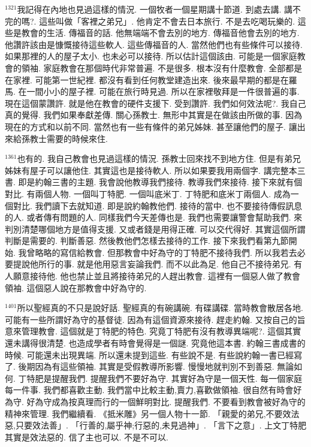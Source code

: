 \documentclass{book}
\begin{document}
$^{1321}$我記得在內地也見過這樣的情況.
一個牧者一個星期講十節道.
到處去講.
講不完的嗎?.
這些叫做「客裡之弟兄」.
他肯定不會去日本旅行.
不是去吃喝玩樂的.
這些是教會的生活.
傳福音的話.
他無端端不會去別的地方.
傳福音他會去別的地方.
他讚許該由是慷慨接待這些軟人.
這些傳福音的人.
當然他們也有些條件可以接待.
如果那裡的人的屋子太小.
也未必可以接待.
所以估計這個該由.
可能是一個家庭教會的領袖.
家庭教會在那個時代非常普遍.
不是很多.
根本沒有什麼教會.
全部都是在家裡.
可能第一世紀裡.
都沒有看到任何教堂建造出來.
後來最早期的都是在羅馬.
在一間小小的屋子裡.
可能在旅行時見過.
所以在家裡敬拜是一件很普遍的事.
現在這個蒙讚許.
就是他在教會的硬件支援下.
受到讚許.
我們如何效法呢?.
我自己真的覺得.
我們如果奉獻差傳.
關心孫教士.
無形中其實是在做該由所做的事.
因為現在的方式和以前不同.
當然也有一些有條件的弟兄姊妹.
甚至讓他們的屋子.
讓出來給孫教士需要的時候來住.

$^{1361}$也有的.
我自己教會也見過這樣的情況.
孫教士回來找不到地方住.
但是有弟兄姊妹有屋子可以讓他住.
其實這也是接待軟人.
所以如果要我用兩個字.
講完整本三書.
即是約翰三書的主題.
我會說他教導我們接待.
教導我們來接待.
接下來就有個對比.
有兩個人物.
一個叫丁特肥.
一個叫底米丁.
丁特肥和底米丁兩個人.
成為一個對比.
我們讀下去就知道.
即是說約翰教他們.
接待的當中.
也不要接待傳假訊息的人.
或者傳有問題的人.
同樣我們今天差傳也是.
我們也需要讓警會幫助我們.
來判別清楚哪個地方是值得支援.
又或者錢是用得正確.
可以交代得好.
其實這個所謂判斷是需要的.
判斷善惡.
然後教他們怎樣去接待的工作.
接下來我們看第九節開始.
我曾略略的寫信給教會.
但那教會中好為守的丁特肥不接待我們.
所以我若去必要提說他所行的事.
就是他用惡言妄論我們.
而不以此為足.
他自己不接待弟兄.
有人願意接待他.
他也禁止並且將接待弟兄的人趕出教會.
這裡有一個惡人做了教會領袖.
這個惡人說在那教會中好為守的.

$^{1401}$所以聖經真的不只是說好話.
聖經真的有碗講碗.
有碟講碟.
當時教會散居各地.
可能有一些所謂好為守的基督徒.
因為有這個資源來接待.
趕走約翰.
又按自己的旨意來管理教會.
這個就是丁特肥的特色.
究竟丁特肥有沒有教導異端呢?.
這個其實還未講得很清楚.
也造成學者有時會覺得是一個謎.
究竟他這本書.
約翰三書成書的時候.
可能還未出現異端.
所以還未提到這些.
有些說不是.
有些說約翰一書已經寫了.
後期因為有這些領袖.
其實是受假教導所影響.
慢慢地就判別不到善惡.
無論如何.
丁特肥是提醒我們.
提醒我們不要好為守.
其實好為守是一個天性.
每一個家庭每一件事.
我們都喜歡主動.
我們當中比較主動,賣力,喜歡做領袖.
很自然有時會好為守.
好為守成為按真理而行的一個鮮明對比.
提醒我們.
不要看到教會被好為守的精神來管理.
我們繼續看.
《抵米雕》另一個人物十一節.
「親愛的弟兄,不要效法惡,只要效法善」.
「行善的,屬乎神;行惡的,未見過神」.
「言下之意」.
上文丁特肥其實是效法惡的.
信了主也可以.
不是不可以.
\end{document}

